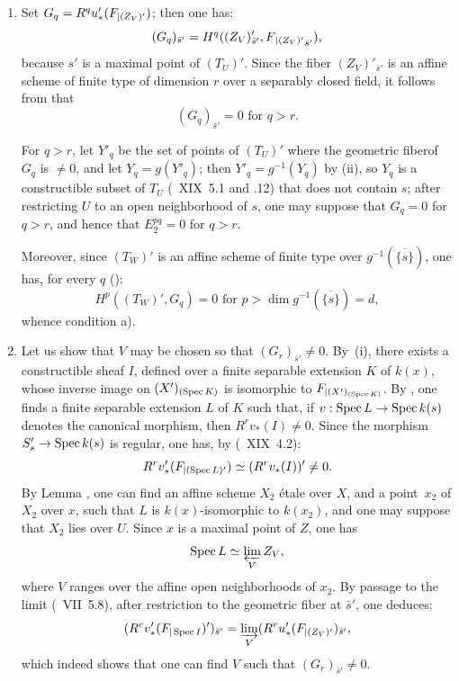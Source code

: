 \begin{enumerate}
\item[$1^\circ)$]
Set $G_q = R^q u'_*(F\sisi{}{_{|(Z_V)'}})$; then one has:
$$(G_q)_{\bar{s}'}=H^q((Z_V)'_{\bar{s}'}, F\sisi{}{{_{|(Z_V)'}}}_{\bar{s}'}),
$$
because $s'$ is a maximal point of $(T_U)'$. Since the fiber $(Z_V)'_{\bar{s}'}$ is an affine scheme of finite type of dimension $r$ over a separably closed field, it follows from  that
$$(G_q)_{\bar{s}'}=0 \text{ for } q>r.
$$

For $q>r$, let $Y'_q$ be the set of points of $(T_U)'$ where the geometric fiber\pageoriginale of $G_q$ is $\neq 0$, and let $Y_q=g(Y'_q)$; then $Y'_q = g^{-1}(Y_q)$ by \textup{(ii)}, so $Y_q$ is a constructible subset of $T_U$ (~XIX~5.1 and .12) that does not contain $s$; after restricting $U$ to an open neighborhood of $s$, one may suppose that $G_q=0$ for $q>r$, and hence that $E_2^{pq}=0$ for $q>r$.

Moreover, since $(T_W)'$ is an affine scheme of finite type over $g^{-1}(\overline{\{s\}})$, one has, for every $q$ (\cf {}):
$$H^p((T_W)', G_q)=0 \text{ for } p>\dim g^{-1}(\overline{\{s\}})=d,
$$
whence condition a).

\item[$2^\circ)$]
Let us show that $V$ may be chosen so that $(G_r)_{\bar{s}'} \neq 0$. By~\textup{(i)}, there exists a constructible sheaf $I$, defined over a finite separable extension $K$ of $k(x)$, whose inverse image on $(X')_{(\Spec K)}$ is isomorphic to $\sisi{F{|(X')_{(\Spec K)}}}{F_{|(X')_{(\Spec K)}}}$. By , one finds a finite separable extension $L$ of $K$ such that, if $v:\Spec L \to \Spec k(s)$ denotes the canonical morphism, then $R^r v_*(I) \neq 0$. Since the morphism $S'_s \to \Spec k(s)$ is regular, one has, by (~XIX~4.2):
$$R^rv_*'(\sisi{F{|(\Spec L)'}}{F_{|(\Spec L)'}}) \simeq (R^rv_*(I))' \neq 0.
$$
By Lemma , one can find an affine scheme $X_2$ \'{e}tale over $X$, and a point~$x_2$ of $X_2$ over $x$, such that $L$ is $k(x)$-isomorphic to $k(x_2)$, and one may suppose that $X_2$ lies over $U$. Since $x$ is a maximal point of $Z$, one has\pageoriginale
$$
\Spec L \simeq \varprojlim_V Z_V,
$$
where $V$ ranges over the affine open neighborhoods of $x_2$. By passage to the limit (~VII~5.8), after restriction to the geometric fiber at $\bar{s}'$, one deduces:
$$
(R^rv_*'(\sisi{F{|\Spec I}}{F_{|\Spec I}})')_{\bar{s}'} = \varinjlim_V (R^ru_*'(F\sisi{}{_{|(Z_V)'}})_{\bar{s}'},
$$
which indeed shows that one can find $V$ such that $(G_r)_{\bar{s}'} \neq 0$.


\end{enumerate}
